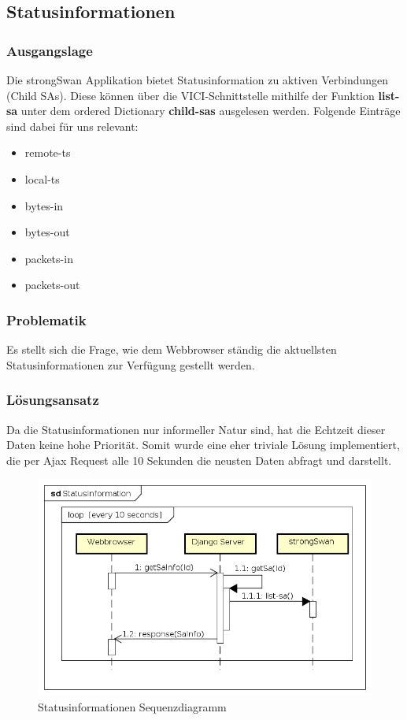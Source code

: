 \subsection{Statusinformationen}
\subsubsection{Ausgangslage}
Die strongSwan Applikation bietet Statusinformation zu aktiven Verbindungen (Child SAs). Diese können über die VICI-Schnittstelle mithilfe der Funktion \textbf{list-sa} unter dem ordered Dictionary \textbf{child-sas} ausgelesen werden. Folgende Einträge sind dabei für uns relevant:
\begin{itemize}
    \item remote-ts
    \item local-ts
    \item bytes-in
    \item bytes-out
    \item packets-in
    \item packets-out
\end{itemize}

\subsubsection{Problematik}
Es stellt sich die Frage, wie dem Webbrowser ständig die aktuellsten Statusinformationen zur Verfügung gestellt werden. 

\subsubsection{Lösungsansatz}
Da die Statusinformationen nur informeller Natur sind, hat die Echtzeit dieser Daten keine hohe Priorität. Somit wurde eine eher triviale Lösung implementiert, die per Ajax Request alle 10 Sekunden die neusten Daten abfragt und darstellt.
\begin{figure}[H]
\centering
\includegraphics[width=320pt]{images/StatusInformation.png}
\caption[Statusinformationen Sequenzdiagramm]{Statusinformationen Sequenzdiagramm}
\end{figure}

\newpage